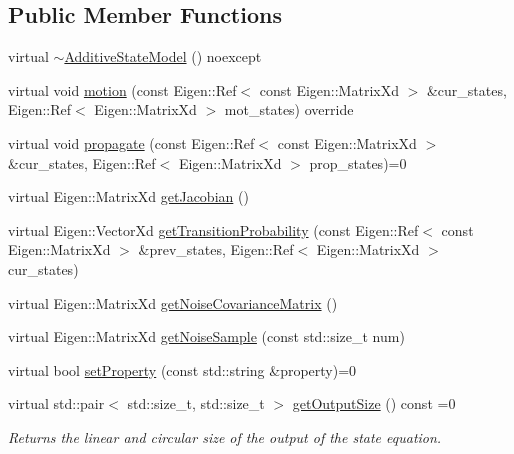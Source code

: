 \subsection*{Public Member Functions}
\begin{DoxyCompactItemize}
\item 
virtual \mbox{\hyperlink{classbfl_1_1AdditiveStateModel_a83769aadf851ecb2aef511dafd75e828}{$\sim$\+Additive\+State\+Model}} () noexcept
\item 
virtual void \mbox{\hyperlink{classbfl_1_1AdditiveStateModel_a9f145bf8c592fc0092d84421f26dbb8b}{motion}} (const Eigen\+::\+Ref$<$ const Eigen\+::\+Matrix\+Xd $>$ \&cur\+\_\+states, Eigen\+::\+Ref$<$ Eigen\+::\+Matrix\+Xd $>$ mot\+\_\+states) override
\item 
virtual void \mbox{\hyperlink{classbfl_1_1StateModel_a39cd8c8c5adbd623884583b4a7a7415c}{propagate}} (const Eigen\+::\+Ref$<$ const Eigen\+::\+Matrix\+Xd $>$ \&cur\+\_\+states, Eigen\+::\+Ref$<$ Eigen\+::\+Matrix\+Xd $>$ prop\+\_\+states)=0
\item 
virtual Eigen\+::\+Matrix\+Xd \mbox{\hyperlink{classbfl_1_1StateModel_a78df4b39578345142fcfb18abaab2177}{get\+Jacobian}} ()
\item 
virtual Eigen\+::\+Vector\+Xd \mbox{\hyperlink{classbfl_1_1StateModel_acb582cb7d41ec7b854ed1dbd8965b6fc}{get\+Transition\+Probability}} (const Eigen\+::\+Ref$<$ const Eigen\+::\+Matrix\+Xd $>$ \&prev\+\_\+states, Eigen\+::\+Ref$<$ Eigen\+::\+Matrix\+Xd $>$ cur\+\_\+states)
\item 
virtual Eigen\+::\+Matrix\+Xd \mbox{\hyperlink{classbfl_1_1StateModel_a423c1fa86b9d60c8663dedc6cdcae276}{get\+Noise\+Covariance\+Matrix}} ()
\item 
virtual Eigen\+::\+Matrix\+Xd \mbox{\hyperlink{classbfl_1_1StateModel_acc6733af2dcba2a330bf7c59c3725e42}{get\+Noise\+Sample}} (const std\+::size\+\_\+t num)
\item 
virtual bool \mbox{\hyperlink{classbfl_1_1StateModel_ac86dcdad8f0bbfab39a23e592779feaa}{set\+Property}} (const std\+::string \&property)=0
\item 
virtual std\+::pair$<$ std\+::size\+\_\+t, std\+::size\+\_\+t $>$ \mbox{\hyperlink{classbfl_1_1StateModel_a6bf680b689389d959fc9ac46595e6dab}{get\+Output\+Size}} () const =0
\begin{DoxyCompactList}\small\item\em Returns the linear and circular size of the output of the state equation. \end{DoxyCompactList}\end{DoxyCompactItemize}


